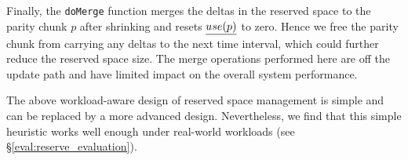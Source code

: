 Finally, the \texttt{doMerge} function merges the deltas in the reserved space
to
the parity chunk $p$ after shrinking and resets $\emph{use(p)}$ to zero. Hence
we free the parity chunk from carrying any deltas to the next time interval,
which could further reduce the reserved space size.  The merge operations
performed here are off the update path and have limited impact on the overall
system performance. 


The above workload-aware design of reserved space management is simple and can
be replaced by a more advanced design.  Nevertheless, we find that this simple
heuristic works well enough under real-world workloads (see
\S\ref{eval:reserve_evaluation}). 



